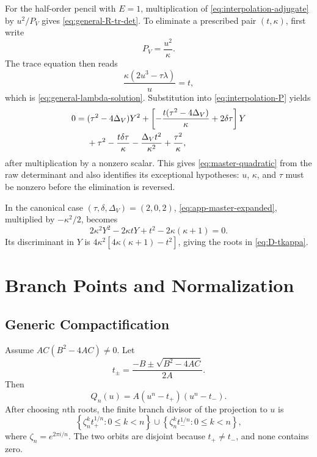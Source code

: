 \documentclass[11pt,reqno]{amsart}
\theoremstyle{remark}
\begin{document}
For the half-order pencil with $E=1$, multiplication of
\eqref{eq:interpolation-adjugate} by $u^2/P_V$ gives
\eqref{eq:general-R-tr-det}.  To eliminate a prescribed pair $(t,\kappa)$,
first
write
\begin{equation}\label{eq:app-det-match}
 P_V=\frac{u^2}{\kappa}.
\end{equation}
The trace equation then reads
\begin{equation}\label{eq:app-trace-match}
 \frac{\kappa(2u^3-\tau\lambda)}u=t,
\end{equation}
which is \eqref{eq:general-lambda-solution}.  Substitution into
\eqref{eq:interpolation-P} yields
\begin{align}
 0={}&(\tau^2-4\Delta_V)Y^2
 +\left[-\frac{t(\tau^2-4\Delta_V)}\kappa+2\delta\tau\right]Y
 \notag\\
 &+\tau^2-\frac{t\delta\tau}\kappa
 -\frac{\Delta_Vt^2}{\kappa^2}+\frac{\tau^2}{\kappa},
 \label{eq:app-master-expanded}
\end{align}
after multiplication by a nonzero scalar.  This gives
\eqref{eq:master-quadratic} from the raw determinant and also identifies its
exceptional hypotheses: $u$, $\kappa$, and $\tau$ must be nonzero before the
elimination is reversed.

In the canonical case $(\tau,\delta,\Delta_V)=(2,0,2)$,
\eqref{eq:app-master-expanded}, multiplied by $-\kappa^2/2$, becomes
\begin{equation}\label{eq:app-canonical-master}
 2\kappa^2Y^2-2\kappa tY+t^2-2\kappa(\kappa+1)=0.
\end{equation}
Its discriminant in $Y$ is
$4\kappa^2[4\kappa(\kappa+1)-t^2]$, giving the roots in
\eqref{eq:D-tkappa}.

\section{Branch Points and Normalization}\label{app:normalization}

\subsection{Generic Compactification}

Assume $A C(B^2-4AC)\ne0$.  Let
\begin{equation}\label{eq:app-tpm}
 t_\pm=\frac{-B\pm\sqrt{B^2-4AC}}{2A}.
\end{equation}
Then
\begin{equation}\label{eq:app-Q-factor}
 Q_n(u)=A(u^n-t_+)(u^n-t_-).
\end{equation}
After choosing $n$th roots, the finite branch divisor of the projection to
$u$ is
\begin{equation}\label{eq:app-branch-divisor}
 \left\{\zeta_n^k t_+^{1/n}:0\leq k<n\right\}
 \mathbin{\cup}
 \left\{\zeta_n^k t_-^{1/n}:0\leq k<n\right\},
\end{equation}
where $\zeta_n=e^{2\pi i/n}$.  The two orbits are disjoint because
$t_+\ne t_-$, and none contains zero.
\end{document}
